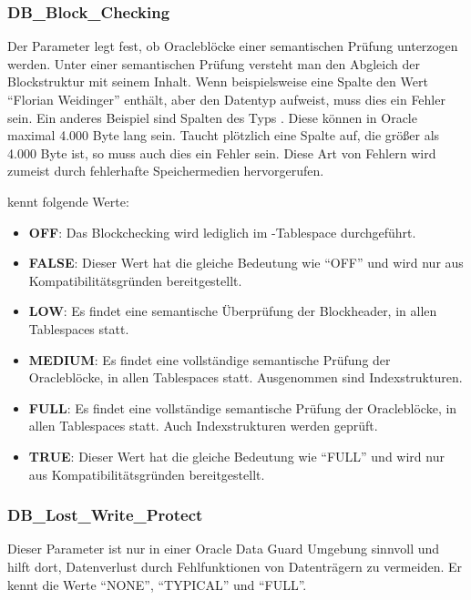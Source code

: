         \subsubsection{DB\_Block\_Checking}
          Der Parameter  legt fest, ob Oraclebl\"ocke einer semantischen Pr\"ufung unterzogen werden. Unter einer semantischen Pr\"ufung versteht man den Abgleich der Blockstruktur mit seinem Inhalt. Wenn beispielsweise eine Spalte den Wert \enquote{Florian Weidinger} enth\"alt, aber den Datentyp  aufweist, muss dies ein Fehler sein. Ein anderes Beispiel sind Spalten des Typs . Diese k\"onnen in Oracle maximal 4.000 Byte lang sein. Taucht pl\"otzlich eine Spalte auf, die gr\"o\ss{}er als 4.000 Byte ist, so muss auch dies ein Fehler sein. Diese Art von Fehlern wird zumeist durch fehlerhafte Speichermedien hervorgerufen.

           kennt folgende Werte:
          \begin{itemize}
            \item \textbf{OFF}: Das Blockchecking wird lediglich im -Tablespace durchgef\"uhrt.
            \item \textbf{FALSE}: Dieser Wert hat die gleiche Bedeutung wie \enquote{OFF} und wird nur aus Kompatibilit\"atsgr\"unden bereitgestellt.
            \item \textbf{LOW}: Es findet eine semantische \"Uberpr\"ufung der Blockheader, in allen Tablespaces statt.
            \item \textbf{MEDIUM}: Es findet eine vollst\"andige semantische Pr\"ufung der Oraclebl\"ocke, in allen Tablespaces statt. Ausgenommen sind Indexstrukturen.
            \item \textbf{FULL}: Es findet eine vollst\"andige semantische Pr\"ufung der Oraclebl\"ocke, in allen Tablespaces statt. Auch Indexstrukturen werden gepr\"uft.
            \item \textbf{TRUE}: Dieser Wert hat die gleiche Bedeutung wie \enquote{FULL} und wird nur aus Kompatibilit\"atsgr\"unden bereitgestellt.
          \end{itemize}
        \subsubsection{DB\_Lost\_Write\_Protect}
          Dieser Parameter ist nur in einer Oracle Data Guard Umgebung sinnvoll und hilft dort, Datenverlust durch Fehlfunktionen von Datentr\"agern zu vermeiden. Er kennt die Werte \enquote{NONE}, \enquote{TYPICAL} und \enquote{FULL}.
